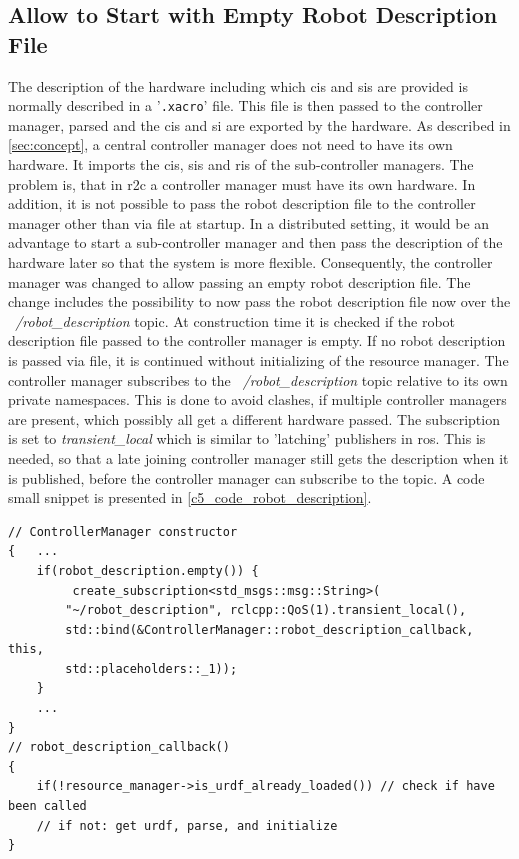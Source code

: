 \subsection{Allow to Start with Empty Robot Description File}
The description of the hardware including which \glspl{ci} and \glspl{si} are provided is normally described in a '\texttt{.xacro}' file. This file is then passed to the controller manager, parsed and the \glspl{ci} and \gls{si} are exported by the hardware. 
As described in \autoref{sec:concept}, a central controller manager does not need to have its own hardware. It imports the \glspl{ci}, \glspl{si} and \glspl{ri} of the sub-controller managers. The problem is, that in \gls{r2c} a controller manager must have its own hardware. In addition, it is not possible to pass the robot description file to the controller manager other than via file at startup. In a distributed setting, it would be an advantage to start a sub-controller manager and then pass the description of the hardware later so that the system is more flexible. \newline
Consequently, the controller manager was changed to allow passing an empty robot description file. The change includes the possibility to now pass the robot description file now over the \textit{~/robot\_description} topic. At construction time it is checked if the robot description file passed to the controller manager is empty. If no robot description is passed via file, it is continued without initializing of the resource manager. The controller manager subscribes to the \textit{~/robot\_description} topic relative to its own private namespaces. This is done to avoid clashes, if multiple controller managers are present, which possibly all get a different hardware passed. The subscription is set to \textit{transient\_local} which is similar to 'latching' publishers in \gls{ros}. This is needed, so that a late joining controller manager still gets the description when it is published, before the controller manager can subscribe to the topic. A code small snippet is presented in \autoref{c5_code_robot_description}.
\lstset{language=C++,basicstyle=\small}
\begin{lstlisting}[caption=Small code snippet for usage of the robot\_description topic.,label=c5_code_robot_description]
// ControllerManager constructor
{   ...
    if(robot_description.empty()) {
         create_subscription<std_msgs::msg::String>(
        "~/robot_description", rclcpp::QoS(1).transient_local(),
        std::bind(&ControllerManager::robot_description_callback, this,
        std::placeholders::_1));
    } 
    ...
}
// robot_description_callback()
{
    if(!resource_manager->is_urdf_already_loaded()) // check if have been called
    // if not: get urdf, parse, and initialize
}
\end{lstlisting}


